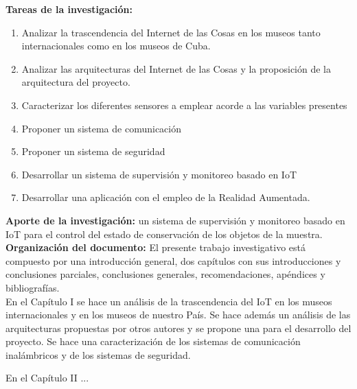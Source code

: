     \textbf{Tareas de la investigación:}
    \begin{enumerate} %
        \item Analizar la trascendencia del Internet de las Cosas en los museos tanto internacionales como en los museos de Cuba.
        \item Analizar las arquitecturas del Internet de las Cosas y la proposición de la arquitectura del proyecto.
        \item Caracterizar los diferentes sensores a emplear acorde a las variables presentes
        \item Proponer un sistema de comunicación
        \item Proponer un sistema de seguridad
        \item Desarrollar un sistema de supervisión y monitoreo basado en IoT
        \item Desarrollar una aplicación con el empleo de la Realidad Aumentada.
    \end{enumerate}

    \textbf{Aporte de la investigación: } un sistema de supervisión y monitoreo basado en IoT para el control del estado de conservación de los objetos de la muestra.\\

    \textbf{Organización del documento: }El presente trabajo investigativo está compuesto por una introducción general, dos capítulos con sus introducciones y conclusiones parciales, conclusiones generales, recomendaciones, apéndices y bibliografías.\\

    En el Capítulo I se hace un análisis de la trascendencia del IoT en los museos internacionales y en los museos de nuestro País.
    Se hace además un análisis de las arquitecturas propuestas por otros autores y se propone una para el desarrollo del proyecto.
    Se hace una caracterización de los sistemas de comunicación inalámbricos y de los sistemas de seguridad.

    En el Capítulo II ...    

    